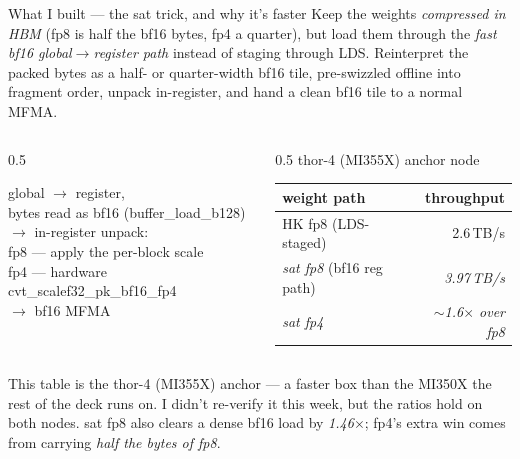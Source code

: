 \documentclass[pdf,aspectratio=169]{beamer}
\newcommand{\empy}[1]{{\color{darkorange}\emph{#1}}}
\newcommand{\empr}[1]{{\color{cardinalred}\emph{#1}}}
\newcommand{\examplebox}[2]{%
\begin{tcolorbox}[colframe=darkcardinal,colback=boxgray,title={#1}]
#2
\end{tcolorbox}}
\newcommand{\mc}[1]{{\ttfamily\small #1}}
\begin{document}
\begin{frame}{What I built --- the \mc{sat} trick, and why it's faster}
\small
Keep the weights \empy{compressed in HBM} (fp8 is half the bf16 bytes, fp4 a quarter), but load them through the \empr{fast bf16 global$\to$register path} instead of staging through LDS. Reinterpret the packed bytes as a half- or quarter-width bf16 tile, pre-swizzled offline into fragment order, unpack in-register, and hand a clean bf16 tile to a normal MFMA.
\vspace{0.5ex}
\begin{columns}
\begin{column}{0.5\textwidth}
\examplebox{The \mc{sat} path}{\small
\mc{global $\to$ register}, \\
bytes read as bf16 ({\ttfamily\scriptsize buffer\_load\_b128}) \\
\mc{$\to$ in-register unpack:} \\
\hspace{1.5ex}fp8 --- apply the per-block scale \\
\hspace{1.5ex}fp4 --- hardware {\ttfamily\scriptsize cvt\_scalef32\_pk\_bf16\_fp4} \\
\mc{$\to$ bf16 MFMA}}
\end{column}
\begin{column}{0.5\textwidth}
\centering\footnotesize thor-4 (MI355X) anchor node
\begin{tabular}{l r}
\toprule
weight path & throughput \\
\midrule
HK fp8 (LDS-staged) & 2.6\,TB/s \\
\empy{\mc{sat} fp8} (bf16 reg path) & \empr{3.97\,TB/s} \\
\empy{\mc{sat} fp4} & \empr{$\sim$1.6$\times$ over fp8} \\
\bottomrule
\end{tabular}
\end{column}
\end{columns}
\vspace{0.5ex}
\footnotesize This table is the thor-4 (MI355X) anchor --- a faster box than the MI350X the rest of the deck runs on. I didn't re-verify it this week, but the ratios hold on both nodes. \mc{sat} fp8 also clears a dense bf16 load by \empy{1.46$\times$}; fp4's extra win comes from carrying \empy{half the bytes of fp8}.
\end{frame}
\end{document}
